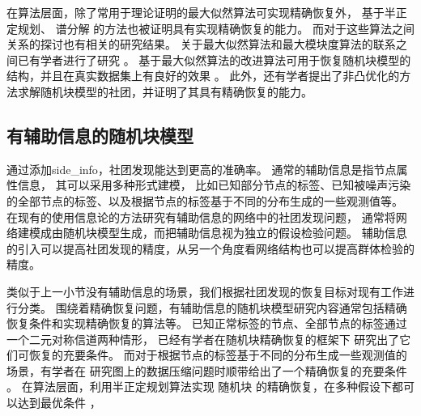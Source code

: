 
在算法层面，除了常用于理论证明的最大似然算法可实现精确恢复外，
基于半正定规划\cite{hajek2016achieving,amini2018semidefinite}、
谱分解\cite{Yun2014} 的方法也被证明具有实现精确恢复的能力。
而对于这些算法之间关系的探讨也有相关的研究结果。
关于最大似然算法和最大模块度算法的联系之间已有学者进行了研究 \cite{newman2016equivalence}。
基于最大似然算法的改进算法可用于恢复随机块模型的结构，并且在真实数据集上有良好的效果
\cite{karrer2011stochastic}。
此外，还有学者提出了非凸优化的方法求解随机块模型的社团，并证明了其具有精确恢复的能力\cite{wang2021non}。




\subsection{有辅助信息的随机块模型}
通过添加\gls{side_info}，社团发现能达到更高的准确率。
通常的辅助信息是指节点属性信息\cite{he2019attribute}，
其可以采用多种形式建模，
比如已知部分节点的标签、已知被噪声污染的全部节点的标签、以及根据节点的标签基于不同的分布生成的一些观测值等\cite{saad2018community}。
在现有的使用信息论的方法研究有辅助信息的网络中的社团发现问题，
通常将网络建模成由随机块模型生成，而把辅助信息视为独立的假设检验问题\cite{ahn2023testing}。
辅助信息的引入可以提高社团发现的精度，从另一个角度看网络结构也可以提高群体检验的精度。

类似于上一小节没有辅助信息的场景，我们根据社团发现的恢复目标对现有工作进行分类。
围绕着精确恢复问题，有辅助信息的随机块模型研究内容通常包括精确恢复条件和实现精确恢复的算法等。
已知正常标签的节点、全部节点的标签通过一个二元对称信道两种情形，
已经有学者在随机块精确恢复的框架下
研究出了它们可恢复的充要条件\cite{saad2018community, esmaeili2019community}。
而对于根据节点的标签基于不同的分布生成一些观测值的场景，有学者在
研究图上的数据压缩问题时顺带给出了一个精确恢复的充要条件 \cite{abbe17sideinfo}。
在算法层面，利用半正定规划算法实现 随机块 的精确恢复，在多种假设下都可以达到最优条件 \cite{esmaeili2019exact}，

